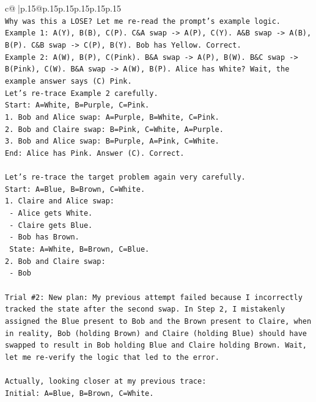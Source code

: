 \documentclass{article}
\begin{document}
{\begin{supertabular}{c@{$\;$}|p{.15\linewidth}@{}p{.15\linewidth}p{.15\linewidth}p{.15\linewidth}p{.15\linewidth}p{.15\linewidth}}
{{{\\ 
\texttt{Why was this a LOSE? Let me re{-}read the prompt's example logic.} \\
\texttt{Example 1: A(Y), B(B), C(P). C\&A swap {-}> A(P), C(Y). A\&B swap {-}> A(B), B(P). C\&B swap {-}> C(P), B(Y). Bob has Yellow. Correct.} \\
\texttt{Example 2: A(W), B(P), C(Pink). B\&A swap {-}> A(P), B(W). B\&C swap {-}> B(Pink), C(W). B\&A swap {-}> A(W), B(P). Alice has White? Wait, the example answer says (C) Pink.} \\
\texttt{Let's re{-}trace Example 2 carefully.} \\
\texttt{Start: A=White, B=Purple, C=Pink.} \\
\texttt{1. Bob and Alice swap: A=Purple, B=White, C=Pink.} \\
\texttt{2. Bob and Claire swap: B=Pink, C=White, A=Purple.} \\
\texttt{3. Bob and Alice swap: B=Purple, A=Pink, C=White.} \\
\texttt{End: Alice has Pink. Answer (C). Correct.} \\
\\ 
\texttt{Let's re{-}trace the target problem again very carefully.} \\
\texttt{Start: A=Blue, B=Brown, C=White.} \\
\texttt{1. Claire and Alice swap:} \\
\texttt{   {-} Alice gets White.} \\
\texttt{   {-} Claire gets Blue.} \\
\texttt{   {-} Bob has Brown.} \\
\texttt{   State: A=White, B=Brown, C=Blue.} \\
\texttt{2. Bob and Claire swap:} \\
\texttt{   {-} Bob} \\
\\ 
\texttt{Trial \#2: New plan: My previous attempt failed because I incorrectly tracked the state after the second swap. In Step 2, I mistakenly assigned the Blue present to Bob and the Brown present to Claire, when in reality, Bob (holding Brown) and Claire (holding Blue) should have swapped to result in Bob holding Blue and Claire holding Brown. Wait, let me re{-}verify the logic that led to the error.} \\
\\ 
\texttt{Actually, looking closer at my previous trace:} \\
\texttt{Initial: A=Blue, B=Brown, C=White.} \\
}}}
\end{supertabular}}
\end{document}

